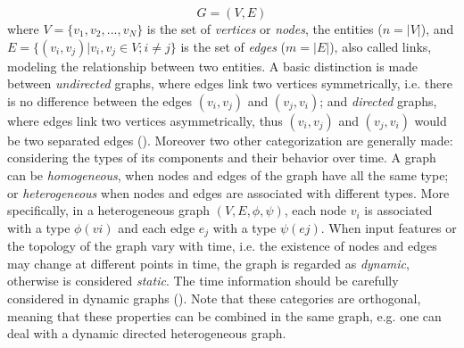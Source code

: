 \documentclass[binding=0.6cm]{sapthesis}
\newcommand{\mycite}[1]{(\cite{#1})}
\begin{document}
\begin{equation}
    \label{eq:bg.gnn.graph-def}
    G = (V,E)
\end{equation}
where $V = \{v_1,v_2,...,v_N\}$ is the set of \textit{vertices} or \textit{nodes}, the entities ($n = |V|$), and $E = \{(v_i,v_j) | v_i,v_j \in V; i \ne j\}$ is the set of \textit{edges} ($m = |E|$), also called links, modeling the relationship between two entities. A basic distinction is made between \textit{undirected} graphs, where edges link two vertices symmetrically, i.e. there is no difference between the edges $(v_i,v_j)$ and $(v_j,v_i)$; and \textit{directed} graphs, where edges link two vertices asymmetrically, thus $(v_i,v_j)$ and $(v_j,v_i)$ would be two separated edges \mycite{cormen2022introduction}. Moreover two other categorization are generally made: considering the types of its components and their behavior  over time. 
A graph can be \textit{homogeneous}, when nodes and edges of the graph have all the same type; or \textit{heterogeneous} when nodes and edges are associated with different types. More specifically, in a heterogeneous graph $(V, E, \phi, \psi)$, each node $v_i$ is associated with a type $\phi(vi)$ and each edge $e_j$ with a type $\psi(ej)$. 
When input features or the topology of the graph vary with time, i.e. the existence of nodes and edges may change at different points in time, the graph is regarded as \textit{dynamic}, otherwise is considered \textit{static}. The time information should be carefully considered in dynamic graphs \mycite{zhou2021graph,wang2021mthetgnn}. Note that these categories are orthogonal, meaning that these properties can be combined in the same graph, e.g. one can deal with a dynamic directed heterogeneous graph.
\end{document}
